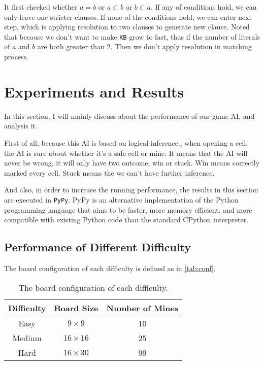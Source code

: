 \documentclass[twocolumn]{extarticle}
\begin{document}
It first checked whether $a = b$ or $a \subset b$ or $b \subset a$. If any of conditions hold, we can only leave one stricter clauses. If none of the conditions hold, we can enter next step, which is applying resolution to two clauses to generate new clause. Noted that because we don't want to make \texttt{KB} grow to fast, thus if the number of literals of $a$ and $b$ are both greater than 2. Then we don't apply resolution in matching process.

\section{Experiments and Results}

In this section, I will mainly discuss about the performance of our game AI, and analysis it.

First of all, because this AI is based on logical inference., when opening a cell, the AI is sure about whether it's a safe cell or mine. It means that the AI will never be wrong, it will only have two outcome, win or stuck. Win means correctly marked every cell. Stuck means the we can't have further inference. 

And also, in order to increase the running performance, the results in this section are executed in \texttt{PyPy}. PyPy is an alternative implementation of the Python programming language that aims to be faster, more memory efficient, and more compatible with existing Python code than the standard CPython interpreter.

\subsection{Performance of Different Difficulty}

The board configuration of each difficulty is defined as in \autoref{tab:conf}.

\begin{table}[H]
\centering
\caption{The board configuration of each difficulty.}
\label{tab:conf}
\begin{tabular}{@{}ccc@{}}
\toprule
\textbf{Difficulty} & \textbf{Board Size} & \textbf{Number of Mines} \\ \midrule
Easy                & $9 \times 9$        & 10                       \\
Medium              & $16 \times 16$      & 25                       \\
Hard                & $16 \times 30$      & 99                       \\ \bottomrule
\end{tabular}
\end{table}
\end{document}
